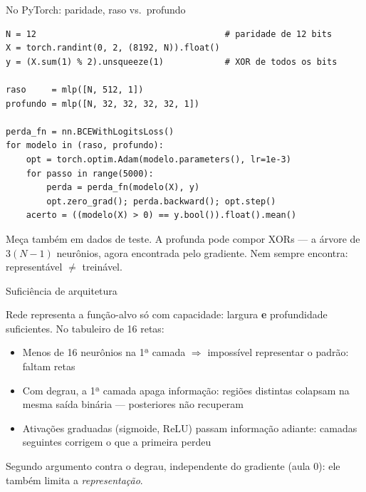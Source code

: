 \documentclass[aspectratio=169, 11pt]{beamer}
\begin{document}
\begin{frame}[fragile]{No PyTorch: paridade, raso vs.\ profundo}

\begin{lstlisting}
N = 12                                     # paridade de 12 bits
X = torch.randint(0, 2, (8192, N)).float()
y = (X.sum(1) % 2).unsqueeze(1)            # XOR de todos os bits

raso     = mlp([N, 512, 1])
profundo = mlp([N, 32, 32, 32, 32, 1])

perda_fn = nn.BCEWithLogitsLoss()
for modelo in (raso, profundo):
    opt = torch.optim.Adam(modelo.parameters(), lr=1e-3)
    for passo in range(5000):
        perda = perda_fn(modelo(X), y)
        opt.zero_grad(); perda.backward(); opt.step()
    acerto = ((modelo(X) > 0) == y.bool()).float().mean()
\end{lstlisting}

  \smallskip
  {\small Meça também em dados de teste. A profunda pode compor XORs — a
  árvore de $3(N-1)$ neurônios, agora encontrada pelo gradiente. Nem sempre
  encontra: representável $\ne$ treinável.}
\end{frame}

\begin{frame}{Suficiência de arquitetura}

  Rede representa a função-alvo só com capacidade: largura \textbf{e}
  profundidade suficientes. No tabuleiro de 16 retas:

  \begin{itemize}\setlength{\itemsep}{0.25ex}
    \item Menos de 16 neurônios na 1ª camada $\Rightarrow$ impossível
          representar o padrão: faltam retas
    \item Com degrau, a 1ª camada \alert{apaga informação}: regiões
          distintas colapsam na mesma saída binária — posteriores não
          recuperam
    \item Ativações graduadas (sigmoide, ReLU) passam informação adiante:
          camadas seguintes corrigem o que a primeira perdeu
  \end{itemize}

  \smallskip
  \begin{ideiabox}
    Segundo argumento contra o degrau, independente do gradiente (aula 0):
    ele também limita a \emph{representação}.
  \end{ideiabox}
\end{frame}
\end{document}
